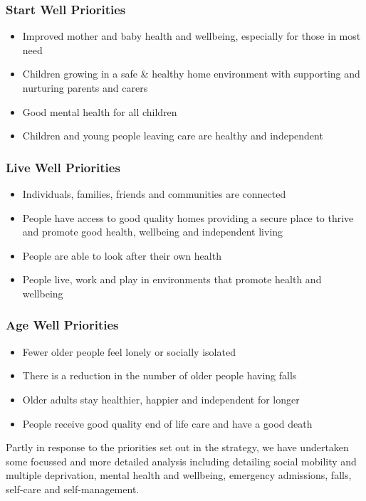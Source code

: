 \subsubsection{Start Well Priorities}
\begin{itemize}[noitemsep]
    \item Improved mother and baby health and wellbeing, especially for those in most need
    \item Children growing in a safe \& healthy home environment with supporting and nurturing parents and carers
    \item Good mental health for all children
    \item Children and young people leaving care are healthy and independent
\end{itemize}
\subsubsection{Live Well Priorities}
\begin{itemize}[noitemsep]
    \item Individuals, families, friends and communities are connected
    \item People have access to good quality homes providing a secure place to thrive and promote good health, wellbeing and independent living
    \item People are able to look after their own health
    \item People live, work and play in environments that promote health and wellbeing
\end{itemize}

\subsubsection{Age Well Priorities}
\begin{itemize}[noitemsep]
    \item Fewer older people feel lonely or socially isolated
    \item There is a reduction in the number of older people having falls
    \item Older adults stay healthier, happier and independent for longer
    \item People receive good quality end of life care and have a good death
\end{itemize}

Partly in response to the priorities set out in the strategy, we have undertaken some focussed and more detailed analysis including detailing social mobility and multiple deprivation, mental health and wellbeing, emergency admissions, falls, self-care and self-management.

